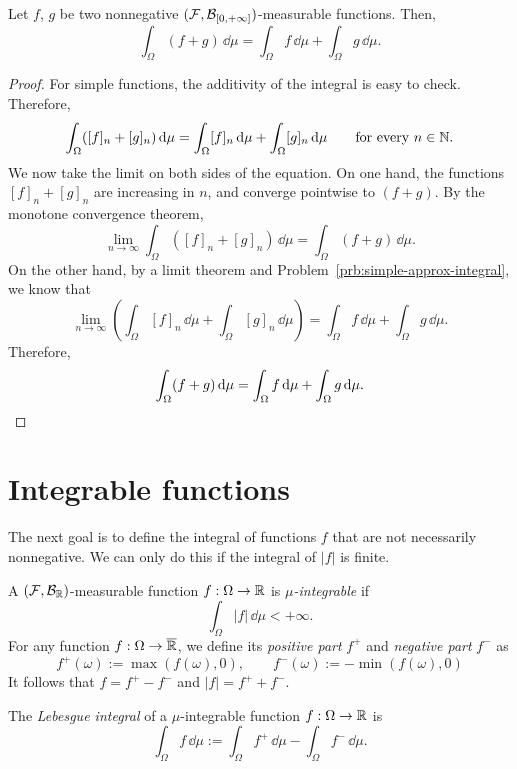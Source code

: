 \begin{lemma}
	\label{pr:additivity-integral-nonneg}
	Let $f$, $g$ be two nonnegative $(\mathcal F,\mathcal B_{[0,+\infty]})$-measurable functions. Then,
	\[
		\int_\Omega (f + g)\, \dd \mu = \int_\Omega f\, \dd \mu + \int_\Omega g\, \dd \mu.
	\]	
\end{lemma}
\begin{proof}
	For simple functions, the additivity of the integral is easy to check. Therefore, 
	\[
	\int_\Omega ([f]_n + [g]_n)\, \mathrm{d} \mu = \int_\Omega [f]_n\, \mathrm{d} \mu + \int_\Omega [g]_n\, \mathrm{d} \mu\qquad\text{for every $n \in \mathbb N$.}
	\]
	We now take the limit on both sides of the equation. On one hand, the functions $[f]_n + [g]_n$ are increasing in $n$, and converge pointwise to $(f + g)$. By the monotone convergence theorem,
	\[
	\lim_{n \to \infty} \int_\Omega ([f]_n + [g]_n)\, \dd \mu = 
	\int_\Omega ( f + g)\, \dd \mu.
	\]
	On the other hand, by a limit theorem and Problem~\ref{prb:simple-approx-integral}, we know that 
	\[
	\lim_{n \to \infty} \left( \int_\Omega [f]_n\, \dd \mu + \int_\Omega [g]_n\, \dd \mu \right) = \int_\Omega f\, \dd \mu + \int_\Omega g\, \dd \mu.
	\]
	Therefore,
	\[
	\int_\Omega (f + g)\, \mathrm{d} \mu = \int_\Omega f\, \mathrm{d} \mu + \int_\Omega g\, \mathrm{d} \mu.\qedhere
	\]
\end{proof}


\section{Integrable functions}\label{sec:integrable}

The next goal is to define the integral of functions $f$ that are not necessarily nonnegative. We can only do this if the integral of $|f|$ is finite.

\begin{definition}
	A $(\mathcal F,\mathcal B_{\mathbb R})$-measurable function $f: \Omega \to \mathbb R$ is \emph{$\mu$-integrable} if 
	\[
	\int_\Omega |f|\, \dd \mu < +\infty.	
	\]
	For any function $f: \Omega \to \overline{\mathbb R}$, we define its \emph{positive part} $f^+$ and \emph{negative part} $f^-$ as
\[
	f^+(\omega) := \max( f(\omega), 0 ),\qquad 
	f^-(\omega) := - \min( f(\omega), 0 ) 
\]
It follows that $f = f^+ - f^-$ and $|f| = f^+ + f^-$.

	The \emph{Lebesgue integral} of a $\mu$-integrable function $f: \Omega \to \mathbb R$ is
	\[
		\int_\Omega f\,\dd \mu := \int_\Omega f^+\, \dd \mu - \int_\Omega f^-\, \dd \mu.
	\]
\end{definition}

